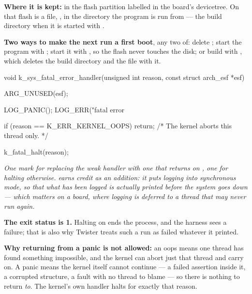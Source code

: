 \textbf{Where it is kept:} in the flash partition labelled  in the board's
devicetree. On  that flash is a file, , in the directory the
program is run from --- the build directory when it is started with .

\textbf{Two ways to make the next run a first boot}, any two of: delete ; start the
program with ; start it with , so the flash never touches the
disk; or build with , which deletes the build directory and the file with it. 


\begin{ccode}
void k_sys_fatal_error_handler(unsigned int reason, const struct arch_esf *esf)
{
	ARG_UNUSED(esf);

	LOG_PANIC();
	LOG_ERR("fatal error %

	if (reason == K_ERR_KERNEL_OOPS) {
		return;                 /* The kernel aborts this thread only. */
	}

	k_fatal_halt(reason);
}
\end{ccode}

\noindent{}

\noindent\emph{One mark for replacing the weak handler with one that returns on
, one for halting otherwise.  earns credit as an addition:
it puts logging into synchronous mode, so that what has been logged is actually printed before the
system goes down --- which matters on a board, where logging is deferred to a thread that may never
run again.}

\textbf{The exit status is 1.} Halting on  ends the process, and the harness sees a
failure; that is also why Twister treats such a run as failed whatever it printed.

\textbf{Why returning from a panic is not allowed:} an oops means one thread has found something
impossible, and the kernel can abort just that thread and carry on. A panic means the kernel itself
cannot continue --- a failed assertion inside it, a corrupted structure, a fault with no thread to
blame --- so there is nothing to return \emph{to}. The kernel's own handler halts for exactly that
reason. 
